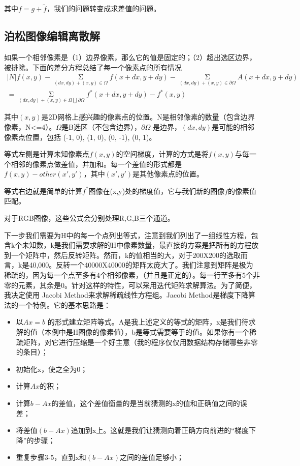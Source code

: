 其中\(f = g + \tilde{f}\)，我们的问题转变成求差值的问题。

\subsection{泊松图像编辑离散解}
如果一个相邻像素是（1）边界像素，那么它的值是固定的；（2）超出选区边界，被排除。下面的差分方程总结了每一个像素点的所有情况
\begin{equation}
\begin{aligned}
|N|f(x,y) - \mathop {\Sigma }\limits_{(dx,dy)+(x,y) \in{\Omega}}f(x+dx,y+dy)
-\mathop {\Sigma }\limits_{(dx,dy)+(x,y) \in{\partial{\Omega}}}A(x+dx,y+dy) \\
= \mathop {\Sigma }\limits_{(dx,dy)+(x,y) \in{\Omega \bigcup {\partial{\Omega}}}}
f^*(x+dx,y+dy) - f^*(x,y)
\end{aligned}
\end{equation}

其中\((x,y)\)是2D网格上感兴趣的像素点的位置。N是相邻像素的数量（包含边界像素，N<=4）。\(\Omega\)是B选区（不包含边界），\(\partial \Omega\) 是边界，\((dx, dy)\)是可能的相邻像素点位置，包括 {(-1, 0), (1, 0), (0, -1), (0, 1)}。

等式左侧是计算未知像素点\(f(x, y)\)的空间梯度，计算的方式是将\(f(x,y)\)与每一个相邻的像素点做差值，并加和。每一个差值的形式都是\(f(x,y) - other(x',y')\)，其中\((x',y')\)是其他像素点的位置。

等式右边就是简单的计算\(f^*\)图像在(x,y)处的梯度值，它与我们新的图像\(f\)的像素值匹配。

对于RGB图像，这些公式会分别处理R,G,B三个通道。

下一步我们需要为H中的每一个点列出等式，注意到我们列出了一组线性方程，包含k个未知数，k是我们需要求解的H中像素数量，最直接的方案是把所有的方程放到一个矩阵中，然后反转矩阵。然而，k的值相当的大，对于200X200的选取而言，k是40,000。反转一个40000X40000的矩阵太庞大了。我们注意到矩阵是极为稀疏的，因为每一个点至多有4个相邻像素，（并且是正定的）。每一行至多有5个非零的元素，其余是0。针对这样的特性，可以采用迭代矩阵求解算法。为了简便，我决定使用 Jacobi Method来求解稀疏线性方程组。Jacobi Method是梯度下降算法的一个特例。它的基本思路是：

\begin{itemize}
\item 以\(A x = b\) 的形式建立矩阵等式。A是我上述定义的等式的矩阵，x是我们待求解的值（本例中是H图像的像素值），b是等式需要等于的值。如果你有一个稀疏矩阵，对它进行压缩是一个好主意（我的程序仅仅用数据结构存储哪些非零的条目）；
\item 初始化x，使之全为0；
\item 计算\(Ax\)的积；
\item 计算\(b-Ax\)的差值，这个差值衡量的是当前猜测的x的值和正确值之间的误差；
\item 将差值\((b-Ax)\)追加到x上。这就是我们让猜测向着正确方向前进的“梯度下降”的步骤；
\item 重复步骤3-5，直到x和\((b-Ax)\)之间的差值足够小；
\end{itemize}


